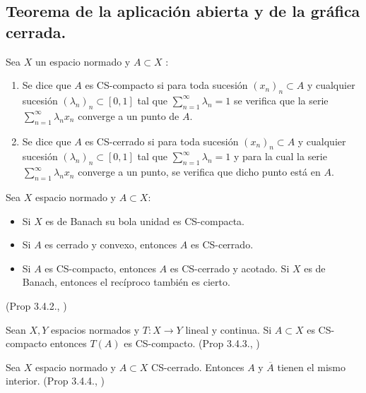 \subsection{Teorema de la aplicación abierta y de la gráfica cerrada.}

\begin{definition}
  Sea $X$ un espacio normado y $A\subset X$ :
  \begin{enumerate}
    \item Se dice que $A$ es CS-compacto si para toda sucesión $(x_n)_n\subset
      A$ y cualquier sucesión $(\lambda_n)_n\subset [0,1]$ tal que
      $\sum_{n=1}^{\infty} \lambda_n=1$ se verifica que la serie
      $\sum_{n=1}^{\infty} \lambda_n x_n$ converge a un punto de $A$.
    \item Se dice que $A$ es CS-cerrado si para toda sucesión $(x_n)_n\subset
      A$ y cualquier sucesión $(\lambda_n)_n\subset [0,1]$ tal que
      $\sum_{n=1}^{\infty} \lambda_n=1$ y para la cual la serie
      $\sum_{n=1}^{\infty} \lambda_n x_n$ converge a un punto, se verifica que
      dicho punto está en $A$.
  \end{enumerate}
\end{definition}

\begin{proposition}
  \label{prop:open-map-1}
  Sea $X$ espacio normado y $A\subset X$:
  \begin{itemize}
    \item Si $X$ es de Banach su bola unidad es CS-compacta.
    \item Si $A$ es cerrado y convexo, entonces $A$ es CS-cerrado.
    \item Si $A$ es CS-compacto, entonces $A$ es CS-cerrado y acotado. Si $X$ es
      de Banach, entonces el recíproco también es cierto.
  \end{itemize}
  (Prop 3.4.2., \cite{cascales2012})
\end{proposition}

\begin{proposition}
  \label{prop:open-map-2}
  Sean $X,Y$ espacios normados y $T:X\to Y$ lineal y continua. Si $A\subset X$ 
  es CS-compacto entonces $T(A)$ es CS-compacto.
  (Prop 3.4.3., \cite{cascales2012})
\end{proposition}

\begin{proposition}
  \label{prop:open-map-3}
  Sea $X$ espacio normado y $A\subset X$ CS-cerrado. Entonces $A$ y
  $\overline{A}$ tienen el mismo interior.
  (Prop 3.4.4., \cite{cascales2012})
\end{proposition}


